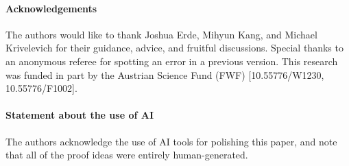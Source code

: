 \documentclass[10pt,a4paper]{article}
\begin{document}
\paragraph{Acknowledgements}
The authors would like to thank Joshua Erde, Mihyun Kang, and Michael Krivelevich for their guidance, advice, and fruitful discussions.
Special thanks to an anonymous referee for spotting an error in a previous version.
This research was funded in part by the Austrian Science Fund (FWF) [10.55776/W1230, 10.55776/F1002].
\paragraph{Statement about the use of AI}
The authors acknowledge the use of AI tools for polishing this paper, and note that all of the proof ideas were entirely human-generated.




\end{document}

